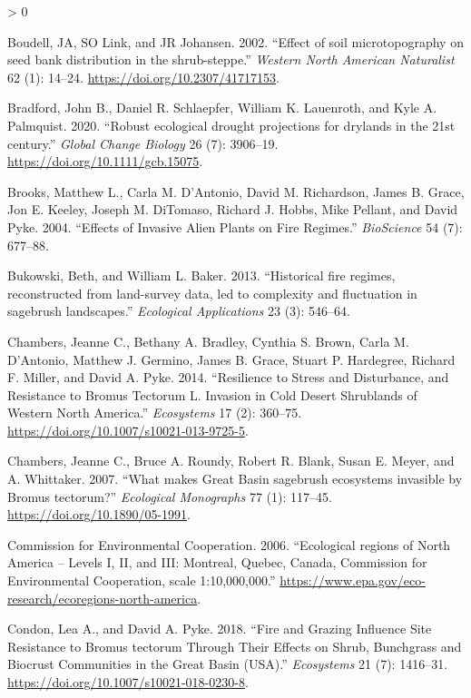 \documentclass[
  12pt,
]{article}
\newlength{\cslhangindent}
\newenvironment{CSLReferences}[2] %
 {%
  \setlength{\parindent}{0pt}
  \ifodd #1 \everypar{\setlength{\hangindent}{\cslhangindent}}\ignorespaces\fi
  \ifnum #2 > 0
  \setlength{\parskip}{#2\baselineskip}
  \fi
 }%
 {}
\begin{document}
\begin{CSLReferences}{1}{0}
\leavevmode\hypertarget{ref-Boudell2002}{}%
Boudell, JA, SO Link, and JR Johansen. 2002. {``{Effect of soil
microtopography on seed bank distribution in the shrub-steppe}.''}
\emph{Western North American Naturalist} 62 (1): 14--24.
\url{https://doi.org/10.2307/41717153}.

\leavevmode\hypertarget{ref-Bradford2020}{}%
Bradford, John B., Daniel R. Schlaepfer, William K. Lauenroth, and Kyle
A. Palmquist. 2020. {``{Robust ecological drought projections for
drylands in the 21st century}.''} \emph{Global Change Biology} 26 (7):
3906--19. \url{https://doi.org/10.1111/gcb.15075}.

\leavevmode\hypertarget{ref-Brooks2004}{}%
Brooks, Matthew L., Carla M. D'Antonio, David M. Richardson, James B.
Grace, Jon E. Keeley, Joseph M. DiTomaso, Richard J. Hobbs, Mike
Pellant, and David Pyke. 2004. {``{Effects of Invasive Alien Plants on
Fire Regimes}.''} \emph{BioScience} 54 (7): 677--88.

\leavevmode\hypertarget{ref-Bukowski2013}{}%
Bukowski, Beth, and William L. Baker. 2013. {``{Historical fire regimes,
reconstructed from land-survey data, led to complexity and fluctuation
in sagebrush landscapes}.''} \emph{Ecological Applications} 23 (3):
546--64.

\leavevmode\hypertarget{ref-chambers_resilience_2014}{}%
Chambers, Jeanne C., Bethany A. Bradley, Cynthia S. Brown, Carla M.
D'Antonio, Matthew J. Germino, James B. Grace, Stuart P. Hardegree,
Richard F. Miller, and David A. Pyke. 2014. {``Resilience to Stress and
Disturbance, and Resistance to {Bromus} Tectorum {L}. Invasion in Cold
Desert Shrublands of Western {North} {America}.''} \emph{Ecosystems} 17
(2): 360--75. \url{https://doi.org/10.1007/s10021-013-9725-5}.

\leavevmode\hypertarget{ref-Chambers2007}{}%
Chambers, Jeanne C., Bruce A. Roundy, Robert R. Blank, Susan E. Meyer,
and A. Whittaker. 2007. {``{What makes Great Basin sagebrush ecosystems
invasible by Bromus tectorum?}''} \emph{Ecological Monographs} 77 (1):
117--45. \url{https://doi.org/10.1890/05-1991}.

\leavevmode\hypertarget{ref-CEC2006}{}%
Commission for Environmental Cooperation. 2006. {``{Ecological regions
of North America -- Levels I, II, and III: Montreal, Quebec, Canada,
Commission for Environmental Cooperation, scale 1:10,000,000}.''}
\url{https://www.epa.gov/eco-research/ecoregions-north-america}.

\leavevmode\hypertarget{ref-Condon2018}{}%
Condon, Lea A., and David A. Pyke. 2018. {``{Fire and Grazing Influence
Site Resistance to Bromus tectorum Through Their Effects on Shrub,
Bunchgrass and Biocrust Communities in the Great Basin (USA)}.''}
\emph{Ecosystems} 21 (7): 1416--31.
\url{https://doi.org/10.1007/s10021-018-0230-8}.


\end{CSLReferences}
\end{document}
